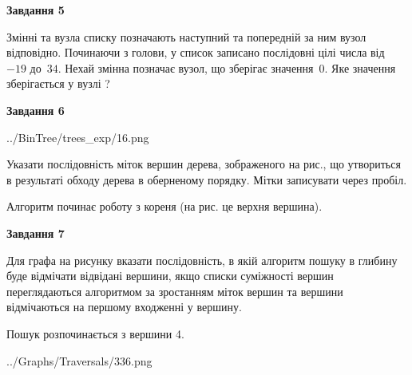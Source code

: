 \documentclass[12pt, ukrainian]{article}
\begin{document}
{\begin {large}
{\begin {center}\textbf{Завдання 5}\end {center}}\par
Змінні  та  вузла списку позначають наступний та попередній за ним вузол відповідно. Починаючи з голови, у список записано послідовні цілі числа від~$-19$ до~$34$. Нехай змінна  позначає вузол, що зберігає значення~$0$.
Яке значення зберігається у вузлі  ?\par
\newpage

{\begin {center}\textbf{Завдання 6}\end {center}}\par

\begin{center}
	{../BinTree/trees_exp/16.png}
\end{center}
Указати послідовність міток вершин дерева, зображеного на рис., що утвориться в результаті обходу дерева в оберненому порядку. Мітки записувати через пробіл.\par Алгоритм починає роботу з кореня (на рис. це верхня вершина).\par
\newpage

{\begin {center}\textbf{Завдання 7}\end {center}}\par
Для графа на рисунку вказати послідовність, в якій алгоритм пошуку в глибину буде відмічати відвідані вершини, якщо списки суміжності вершин переглядаються алгоритмом за зростанням міток вершин та вершини відмічаються на першому вход\-женні у вершину.\par
Пошук розпочинається з вершини 4.\par

\begin{center}
	{../Graphs/Traversals/336.png}
\end{center}\par
\newpage


\end{large}}
\end{document}
